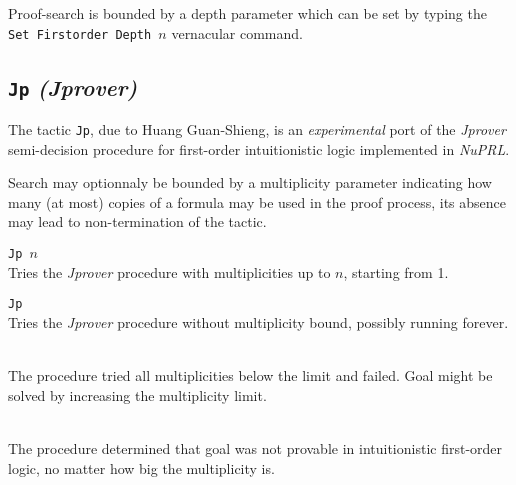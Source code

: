 Proof-search is bounded by a depth parameter which can be set by typing the
{\nobreak \tt Set Firstorder Depth $n$}  
vernacular command.

\subsection{{\tt Jp} {\em (Jprover)}}
\label{Jprover}

The tactic \texttt{Jp}, due to Huang Guan-Shieng, is an {\it
  experimental} port of the {\em Jprover}\cite{SLKN01} semi-decision 
procedure for first-order intuitionistic logic implemented in {\em
  NuPRL}\cite{Kre02}. 

Search may optionnaly be bounded by a multiplicity parameter
indicating how many (at most) copies of a formula may be used in 
the proof process, its absence may lead to non-termination of the tactic.




\begin{Variants}
 \item {\tt Jp $n$}\\
   Tries the {\em Jprover} procedure with multiplicities up to $n$,
   starting from 1.
 \item {\tt Jp}\\
   Tries the {\em Jprover} procedure without multiplicity bound, 
   possibly running forever.
\end{Variants}

\begin{ErrMsgs}
 \item {}\\
   The procedure tried all multiplicities below the limit and
   failed. Goal might be solved by increasing the multiplicity limit. 
 \item {}\\
   The procedure determined that goal was not provable in
   intuitionistic first-order logic, no matter how big the
   multiplicity is.
\end{ErrMsgs}


